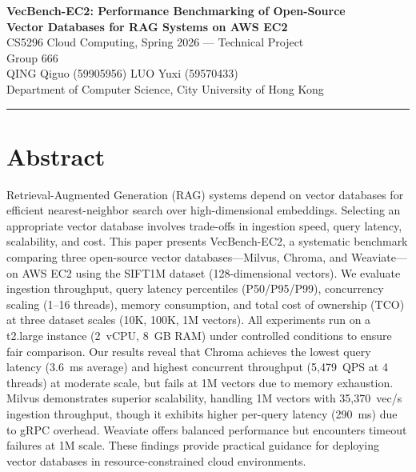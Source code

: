 \documentclass[12pt,a4paper]{article}
\begin{document}
\begin{center}
    {\LARGE\bfseries VecBench-EC2: Performance Benchmarking of Open-Source\\
    Vector Databases for RAG Systems on AWS EC2}\\[12pt]
    {\large CS5296 Cloud Computing, Spring 2026 --- Technical Project}\\[8pt]
    {\large Group 666}\\[6pt]
    QING Qiguo (59905956) \quad LUO Yuxi (59570433)\\[4pt]
    Department of Computer Science, City University of Hong Kong
\end{center}

\vspace{4pt}
\hrule
\vspace{8pt}

\section*{Abstract}

Retrieval-Augmented Generation (RAG) systems depend on vector databases for efficient nearest-neighbor search over high-dimensional embeddings. Selecting an appropriate vector database involves trade-offs in ingestion speed, query latency, scalability, and cost. This paper presents VecBench-EC2, a systematic benchmark comparing three open-source vector databases---Milvus, Chroma, and Weaviate---on AWS EC2 using the SIFT1M dataset (128-dimensional vectors). We evaluate ingestion throughput, query latency percentiles (P50/P95/P99), concurrency scaling (1--16 threads), memory consumption, and total cost of ownership (TCO) at three dataset scales (10K, 100K, 1M vectors). All experiments run on a t2.large instance (2~vCPU, 8~GB RAM) under controlled conditions to ensure fair comparison. Our results reveal that Chroma achieves the lowest query latency (3.6~ms average) and highest concurrent throughput (5,479~QPS at 4 threads) at moderate scale, but fails at 1M vectors due to memory exhaustion. Milvus demonstrates superior scalability, handling 1M vectors with 35,370~vec/s ingestion throughput, though it exhibits higher per-query latency (290~ms) due to gRPC overhead. Weaviate offers balanced performance but encounters timeout failures at 1M scale. These findings provide practical guidance for deploying vector databases in resource-constrained cloud environments.
\end{document}
